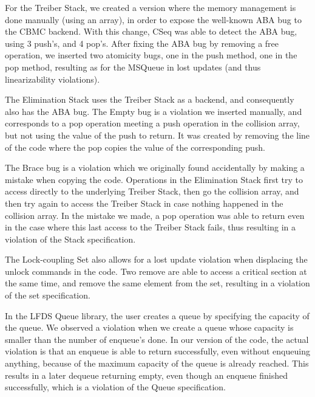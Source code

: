 For the Treiber Stack, we created a version where the memory management is done
manually (using an array), in order to expose the well-known ABA bug{} to the
CBMC backend. With this change, CSeq was able to detect the ABA bug{}, using 3
{\sf push}'s, and 4 {\sf pop}'s. After fixing the ABA bug{} by removing a {\sf
free} operation, we inserted two atomicity bugs, one in the {\sf push} method,
one in the {\sf pop} method, resulting as for the MSQueue in lost updates (and
thus linearizability violations).

The Elimination Stack \citep{conf/spaa/HendlerSY04} uses the Treiber Stack as a
backend, and consequently also has the ABA bug. The Empty bug is a violation we
inserted manually, and corresponds to a {\sf pop} operation meeting a {\sf
push} operation in the collision array, but not using the value of the {\sf
push} to return. It was created by removing the line of the code where the {\sf
pop} copies the value of the corresponding {\sf push}.

The Brace bug is a violation which we originally found accidentally by making a
mistake when copying the code. Operations in the Elimination Stack first try to
access directly to the underlying Treiber Stack, then go the collision array,
and then try again to access the Treiber Stack in case nothing happened in the
collision array. In the mistake we made, a {\sf pop} operation was able to
return even in the case where this last access to the Treiber Stack fails, thus
resulting in a violation of the Stack specification.

The Lock-coupling Set also allows for a lost update violation when displacing
the {\sf unlock} commands in the code. Two {\sf remove} are able to access a
critical section at the same time, and remove the same element from the set,
resulting in a violation of the set specification.
 
In the LFDS Queue library, the user creates a queue by specifying the capacity
of the queue. We observed a violation when we create a queue whose capacity is
smaller than the number of {\sf enqueue}'s done. In our version of the code,
the actual violation is that an {\sf enqueue} is able to return successfully,
even without enqueuing anything, because of the maximum capacity of the queue
is already reached. This results in a later {\sf dequeue} returning empty, even
though an {\sf enqueue} finished successfully, which is a violation of the
Queue specification.
